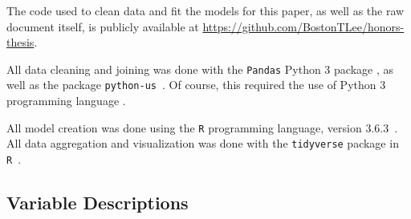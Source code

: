 \documentclass{article}
\begin{document}
The code used to clean data and fit the models for this
paper, as well as the raw document itself,
is publicly available at
\url{https://github.com/BostonTLee/honors-thesis}.

All data cleaning and joining was done with the \texttt{Pandas} Python 3 package
\cite{python_pandas}, as well as the package \texttt{python-us}~\cite{python_us}.
Of course, this required the use of Python 3 programming language
\cite{python_lang}.

All model creation was done using the \texttt{R} programming
language, version 3.6.3~\cite{r_lang}.
All data aggregation and visualization was done with the
\texttt{tidyverse} package in \texttt{R}~\cite{r_tidyverse}.

\subsection{Variable Descriptions}\label{sec:variables}

\newcommand\censuscodes{https://www.census.gov/programs-surveys/acs/technical-documentation/code-lists.2018.html}
\newcommand\descentdesc[1]{ Proportion of the population which is of
    #1 descent. See \url{\censuscodes} for more
    pecise definitions.}
\newcommand\descentreason{Ethnicity is tied to socioeconomic status, which
    could in turn be correlated to one's financial status and mental health.
    Variables related to ethnicity were included to control for variation.}
\newcommand\agedescto[2]{Proportion of the population from #1 to #2 years old.}
\newcommand\agedescover[1]{Proportion of the population over #1 years old.}
\newcommand\agereason{Overall economic status could vary with age, so age
    variables were included to control for variation.}
\newcommand\educationdesc[1]{Proportion of the population 25 years of age and
    over whose maximum educational attainment is #1.}
\newcommand\educationreason{Educational attainment can be used as a general
    measure of socioeconomic status. Variables related to educational
    attainment were included to account for variation.}
\newcommand\maritaldesc[1]{Proportion of the population age 15 and older who
    have marital status ``#1".}
\newcommand\maritalreason{Marital status reflects general socioeconomic status.
    Variables related to marital status are included to account for variation.}
\end{document}
